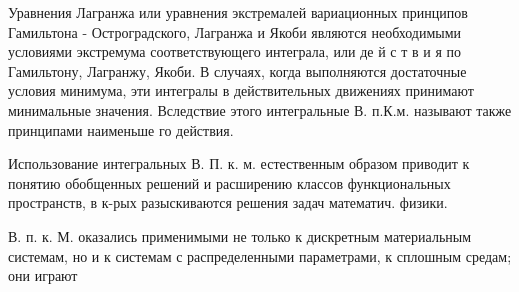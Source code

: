 \documentclass[10pt]{article}
\begin{document}
Уравнения Лагранжа или уравнения экстремалей вариационных принципов Гамильтона - Остроградского, Лагранжа и Якоби являются необходимыми условиями экстремума соответствующего интеграла, или де й с т в и я по Гамильтону, Лагранжу, Якоби. В случаях, когда выполняются достаточные условия минимума, эти интегралы в действительных движениях принимают минимальные значения. Вследствие этого интегральные В. п.К.м. называют также принципами наименьше го действия.



Использование интегральных В. П. к. м. естественным образом приводит к понятию обобщенных решений и расширению классов функциональных пространств, в к-рых разыскиваются решения задач математич. физики.



В. п. к. М. оказались применимыми не только к дискретным материальным системам, но и к системам с распределенными параметрами, к сплошным средам; они играют
\end{document}
